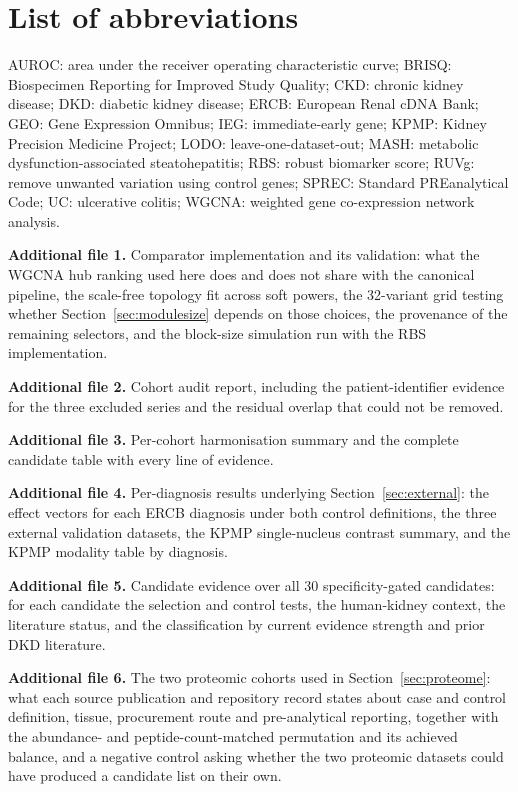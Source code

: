 \documentclass[pdflatex,sn-vancouver-num]{sn-jnl}
\theoremstyle{thmstyleone}
\theoremstyle{thmstyletwo}
\theoremstyle{thmstylethree}
\begin{document}
\section*{List of abbreviations}

AUROC: area under the receiver operating characteristic curve; BRISQ: Biospecimen Reporting for
Improved Study Quality; CKD: chronic kidney disease; DKD: diabetic kidney disease; ERCB: European Renal cDNA Bank; GEO: Gene Expression Omnibus; IEG: immediate-early
gene; KPMP: Kidney Precision Medicine Project; LODO: leave-one-dataset-out; MASH: metabolic
dysfunction-associated steatohepatitis; RBS: robust biomarker
score; RUVg: remove unwanted variation using control genes; SPREC: Standard PREanalytical Code;
UC: ulcerative colitis; WGCNA: weighted gene co-expression network analysis.

\backmatter


\textbf{Additional file 1.} Comparator implementation and its validation: what the WGCNA hub
ranking used here does and does not share with the canonical pipeline, the scale-free topology
fit across soft powers, the 32-variant grid testing whether
Section~\ref{sec:modulesize} depends on those choices, the provenance of the remaining
selectors, and the block-size simulation run with the RBS implementation.

\textbf{Additional file 2.} Cohort audit report, including the patient-identifier evidence for
the three excluded series and the residual overlap that could not be removed.

\textbf{Additional file 3.} Per-cohort harmonisation summary and the complete candidate table
with every line of evidence.

\textbf{Additional file 4.} Per-diagnosis results underlying Section~\ref{sec:external}:
the effect vectors for each ERCB diagnosis under both control definitions, the three
external validation datasets, the KPMP single-nucleus contrast summary, and the KPMP modality
table by diagnosis.

\textbf{Additional file 5.} Candidate evidence over all 30 specificity-gated candidates: for each candidate the selection and control tests, the human-kidney context, the literature status, and the classification by current evidence strength and prior DKD literature.

\textbf{Additional file 6.} The two proteomic cohorts used in Section~\ref{sec:proteome}:
what each source publication and repository record states about case and control definition,
tissue, procurement route and pre-analytical reporting, together with the abundance- and
peptide-count-matched permutation and its achieved balance, and a negative control asking
whether the two proteomic datasets could have produced a candidate list on their own.
\end{document}
